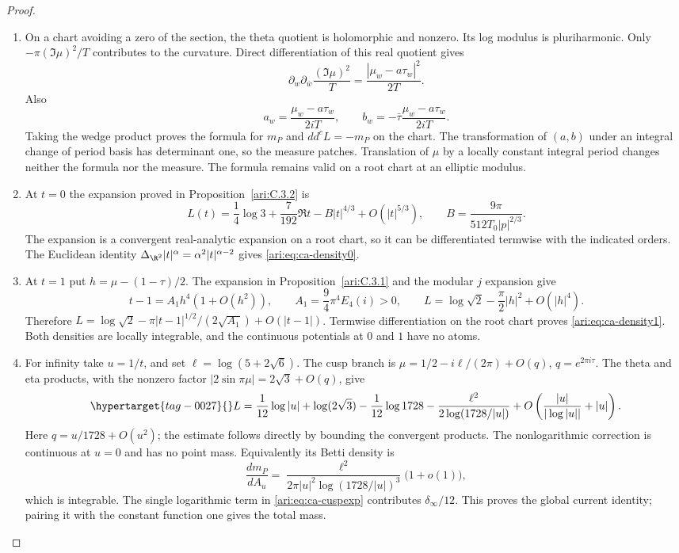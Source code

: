 \begin{proof}
\begin{enumerate}[label=\arabic*.,leftmargin=*]
\item On a chart avoiding a zero of the section, the theta quotient
is holomorphic and nonzero. Its log modulus is pluriharmonic.
Only $-\pi(\Im\mu)^2/T$ contributes to the curvature.
Direct differentiation of this real quotient gives
\[
 \partial_w\partial_{\bar w}\frac{(\Im\mu)^2}{T}
       =\frac{|\mu_w-a\tau_w|^2}{2T}.
\]
Also
\[
 a_w=\frac{\mu_w-a\tau_w}{2iT},\qquad
 b_w=-\bar\tau\frac{\mu_w-a\tau_w}{2iT}.
\]
Taking the wedge product proves the formula for $m_P$ and
$dd^cL=-m_P$ on the chart. The transformation of $(a,b)$
under an integral change of period basis has determinant one,
so the measure patches. Translation of $\mu$ by a locally
constant integral period changes neither the formula nor
the measure. The formula remains valid on a root chart
at an elliptic modulus.

\item At $t=0$ the expansion proved in Proposition~\ref{ari:C.3.2} is
\[
 L(t)=\frac14\log3+\frac7{192}\Re t
       -B|t|^{4/3}+O(|t|^{5/3}),\qquad
 B=\frac{9\pi}{512T_0|p|^{2/3}}.
\]
The expansion is a convergent real-analytic expansion on a
root chart, so it can be differentiated termwise with the
indicated orders. The Euclidean identity
$\Delta_{\R^2}|t|^\alpha=\alpha^2|t|^{\alpha-2}$ gives
\eqref{ari:eq:ca-density0}.

\item At $t=1$ put $h=\mu-(1-\tau)/2$. The expansion in Proposition~\ref{ari:C.3.1}
and the modular $j$ expansion give
\[
 t-1=A_1h^4(1+O(h^2)),\qquad
 A_1=\frac94\pi^4E_4(i)>0,\qquad
 L=\log\sqrt2-\frac\pi2|h|^2+O(|h|^4).
\]
Therefore
$L=\log\sqrt2-\pi|t-1|^{1/2}/(2\sqrt{A_1})+O(|t-1|)$.
Termwise differentiation on the root chart proves
\eqref{ari:eq:ca-density1}. Both densities are locally integrable,
and the continuous potentials at $0$ and $1$ have no atoms.

\item For infinity take $u=1/t$, and set $\ell=\log(5+2\sqrt6)$.
The cusp branch is
$\mu=1/2-i\ell/(2\pi)+O(q)$, $q=e^{2\pi i\tau}$.
The theta and eta products, with the nonzero factor
$|2\sin\pi\mu|=2\sqrt3+O(q)$, give
\begin{equation}\hypertarget{tag-0027}{}\label{ari:eq:ca-cuspexp}
 L=\frac1{12}\log|u|+\log(2\sqrt3)-\frac1{12}\log1728
          -\frac{\ell^2}{2\log(1728/|u|)}
          +O\left(\frac{|u|}{|\log|u||}+|u|\right).
\end{equation}
Here $q=u/1728+O(u^2)$; the estimate follows directly by
bounding the convergent products. The nonlogarithmic
correction is continuous at $u=0$ and has no point mass.
Equivalently its Betti density is
\[
 \frac{dm_P}{dA_u}
  =\frac{\ell^2}{2\pi|u|^2\log(1728/|u|)^3}
       \bigl(1+o(1)\bigr),
\]
which is integrable. The single logarithmic term in
\eqref{ari:eq:ca-cuspexp} contributes $\delta_\infty/12$.
This proves the global current identity; pairing it with
the constant function one gives the total mass.
\end{enumerate}
\end{proof}

